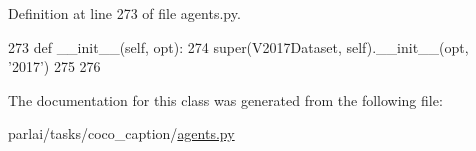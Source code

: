 Definition at line 273 of file agents.\+py.


\begin{DoxyCode}
273     \textcolor{keyword}{def }\_\_init\_\_(self, opt):
274         super(V2017Dataset, self).\_\_init\_\_(opt, \textcolor{stringliteral}{'2017'})
275 
276 
\end{DoxyCode}


The documentation for this class was generated from the following file\+:\begin{DoxyCompactItemize}
\item 
parlai/tasks/coco\+\_\+caption/\hyperlink{parlai_2tasks_2coco__caption_2agents_8py}{agents.\+py}\end{DoxyCompactItemize}
